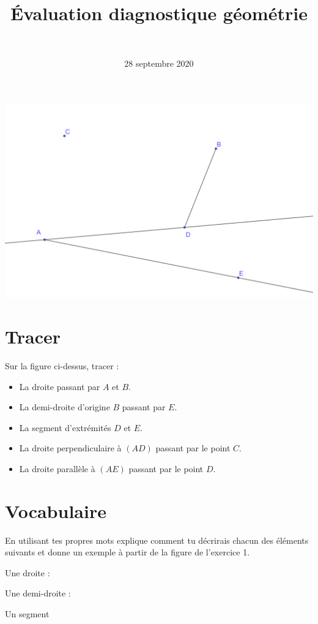 \documentclass[a4paper,12pt]{exam}
\author{\ }
\date{28 septembre 2020}
\title{\'Evaluation diagnostique géométrie}
\begin{document}
%	

\maketitle


\begin{center}
	\includegraphics*[scale=0.55]{figure}
\end{center}

\section{Tracer}

Sur la figure ci-dessus, tracer :

\begin{itemize}
	\item La droite passant par $A$ et $B$.
	\item La demi-droite d'origine $B$ passant par $E$.
	\item La segment d'extrémités $D$ et $E$.
	\item La droite perpendiculaire à $(AD)$ passant par le point $C$. 
	\item La droite parallèle à $(AE)$ passant par le point $D$.
\end{itemize}

\newpage

\section{Vocabulaire}

En utilisant tes propres mots explique comment tu décrirais chacun des éléments suivants et donne un exemple à partir de la figure de l'exercice 1.

\begin{questions}
	
	
	\question Une droite :
	
	\fillwithdottedlines{5cm}
	
	\question Une demi-droite :
	
	\fillwithdottedlines{5cm}
	
	\question Un segment  
	
	\fillwithdottedlines{5cm}
\end{questions}





\label{LastPage}
\end{document}

